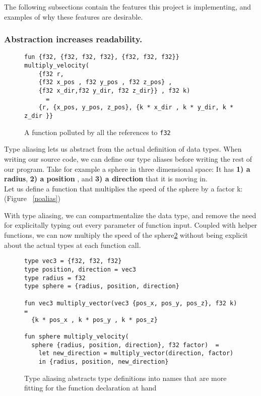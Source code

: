 The following subsections contain the features this project is implementing, and examples of why these features are desirable.
\subsubsection{Abstraction increases readability.} 
\begin{figure}
\begin{mdframed}
\begin{lstlisting}
fun {f32, {f32, f32, f32}, {f32, f32, f32}} multiply_velocity(
	{f32 r, 
	{f32 x_pos , f32 y_pos , f32 z_pos} , 
	{f32 x_dir,f32 y_dir, f32 z_dir}} , f32 k) 
	  =
    {r, {x_pos, y_pos, z_pos}, {k * x_dir , k * y_dir, k * z_dir }}
\end{lstlisting}
\caption{A function polluted by all the references to \texttt{f32} \label{noalias}}
\end{mdframed}
\label{noaliasing}
\end{figure}
Type aliasing lets us abstract from the actual definition of data types.
When writing our source code, we can define our type aliases before writing the
rest of our program. Take for example a sphere in three dimensional space:
It has \textbf{1) a radius}, \textbf{2) a position} , and \textbf{3) a direction} that it is
moving in.\\
Let us define a function that multiplies the speed of the sphere by a factor k: (Figure ~\ref{noalias})
\clearpage

With type aliasing, we can compartmentalize the data type, and remove the need
for explicitally typing out every parameter of function input.
Coupled with helper functions, we can now multiply the speed of the sphere\ref{sphere_example} without being explicit about the actual types at each function call.
\begin{figure}
\begin{verbatim}
type vec3 = {f32, f32, f32}
type position, direction = vec3 
type radius = f32
type sphere = {radius, position, direction}

fun vec3 multiply_vector(vec3 {pos_x, pos_y, pos_z}, f32 k) =
  {k * pos_x , k * pos_y , k * pos_z}

fun sphere multiply_velocity(
  sphere {radius, position, direction}, f32 factor)  =
    let new_direction = multiply_vector(direction, factor)
    in {radius, position, new_direction}
\end{verbatim}
\caption{Type aliasing abstracts type definitions into names that are more
  fitting for the function declaration at hand \label{sphere_example}}
\end{figure}

